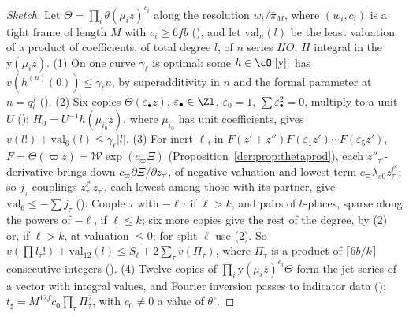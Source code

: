 \begin{proof}[Sketch]
Let $\Theta=\prod_i\theta(\mu_iz)^{c_i}$ along the resolution $w_i/\bar\pi_M$, where $(w_i,c_i)$ is a
tight frame of length $M$ with $c_i\ge6fb$ (), and let
$\mathrm{val}_n(l)$ be the least valuation of a product of coefficients, of total degree $l$, of $n$
series $H\Theta$, $H$ integral in the $\mathrm y(\mu_iz)$. (1) On one curve $\gamma_\ell$ is optimal:
some $h\in\cO[[\mathrm y]]$ has $v(h^{(n)}(0))\le\gamma_\ell n$, by superadditivity in $n$ and the
formal parameter at $n=q_\ell^j$ (). (2) Six copies
$\Theta(\varepsilon_\bullet z)$, $\varepsilon_\bullet\in\Zl$, $\varepsilon_0=1$,
$\sum\varepsilon_\bullet^2=0$, multiply to a unit $U$
(); $H_0=U^{-1}h(\mu_{i_0}z)$, where
$\mu_{i_0}$ has unit coefficients, gives $v(l!)+\mathrm{val}_6(l)\le\gamma_\ell|l|$. (3) For inert
$\ell$, in $F(z'+z'')F(\varepsilon_1z')\cdots F(\varepsilon_5z')$, $F=\Theta(\varpi z)=\mathcal W\exp(c_\varpi\Xi)$
(Proposition~\ref{der:prop:thetaprod}), each $z''_{\tau'}$-derivative brings down
$c_\varpi\partial\Xi/\partial z_{\tau'}$, of negative valuation and lowest term
$c_\varpi\lambda_{e0}z_\tau^{\ell^e}$; so $j_\tau$ couplings $z_\tau^{\ell^e}z_{\tau'}$, each lowest
among those with its partner, give $\mathrm{val}_6\le-\sum j_\tau$
(). Couple $\tau$ with $-\ell\tau$ if $\ell>k$,
and pairs of $b$-places, sparse along the powers of $-\ell$, if $\ell\le k$; six more copies give the
rest of the degree, by (2) or, if $\ell>k$, at valuation $\le0$; for split $\ell$ use (2). So
$v(\prod l_\tau!)+\mathrm{val}_{12}(l)\le S_\ell+2\sum_\tau v(\Pi_\tau)$, where $\Pi_\tau$ is a
product of $\lceil6b/k\rceil$ consecutive integers (). (4) Twelve
copies of $\prod_i\mathrm y(\mu_iz)^{e_i}\Theta$ form the jet series of a vector with integral values,
and Fourier inversion passes to indicator data ();
$t_\sharp=M^{12f}c_0\prod_\tau\Pi_\tau^2$, with $c_0\ne0$ a value of $\theta^\circ$.
\end{proof}
